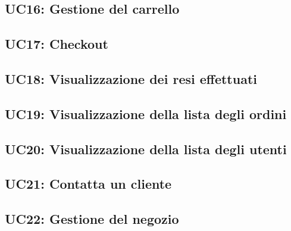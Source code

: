         \subsection{UC16: Gestione del carrello}
        \subsection{UC17: Checkout}
        \subsection{UC18: Visualizzazione dei resi effettuati}
        \subsection{UC19: Visualizzazione della lista degli ordini}
        \subsection{UC20: Visualizzazione della lista degli utenti}
        \subsection{UC21: Contatta un cliente}
        \subsection{UC22: Gestione del negozio}

